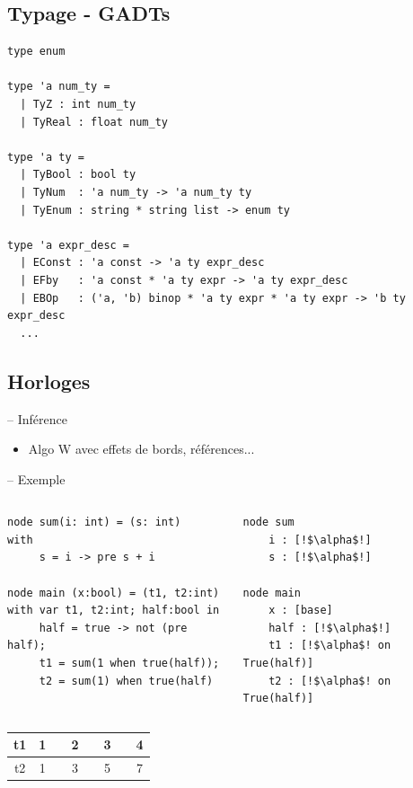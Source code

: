 \documentclass[11pt,usenames,dvipsnames]{beamer}
\begin{document}
\subsection{Typage - GADTs}
\begin{frame}[fragile]{\null}
  \begin{lstlisting}[language=caml]
type enum

type 'a num_ty =
  | TyZ : int num_ty
  | TyReal : float num_ty

type 'a ty =
  | TyBool : bool ty
  | TyNum  : 'a num_ty -> 'a num_ty ty
  | TyEnum : string * string list -> enum ty

type 'a expr_desc =
  | EConst : 'a const -> 'a ty expr_desc
  | EFby   : 'a const * 'a ty expr -> 'a ty expr_desc
  | EBOp   : ('a, 'b) binop * 'a ty expr * 'a ty expr -> 'b ty expr_desc
  ...
  \end{lstlisting}
\end{frame}

\subsection{Horloges}
\begin{frame}[fragile]{-- Inférence}
  \begin{itemize}
  \item Algo W avec effets de bords, références...
  \end{itemize}
\end{frame}

\begin{frame}[fragile]{-- Exemple}
  \begin{columns}
    \begin{column}{0.5\textwidth}
      \begin{lstlisting}[language=minils]
node sum(i: int) = (s: int)
with
     s = i -> pre s + i

node main (x:bool) = (t1, t2:int)
with var t1, t2:int; half:bool in
     half = true -> not (pre half);
     t1 = sum(1 when true(half));
     t2 = sum(1) when true(half)
   \end{lstlisting}
 \end{column}
 \begin{column}{0.5\textwidth}
   \pause
   \begin{lstlisting}[escapechar=!]
node sum
    i : [!$\alpha$!]
    s : [!$\alpha$!]

node main
    x : [base]
    half : [!$\alpha$!]
    t1 : [!$\alpha$! on True(half)]
    t2 : [!$\alpha$! on True(half)]
  \end{lstlisting}
 \end{column}
\end{columns}
\pause
\begin{center}
  \begin{tabular}{|c|ccccccc|}
    \hline
    t1    & 1 &  & 2 & & 3 & & 4\\
    \hline
    t2    & 1 &  & 3 & & 5 & & 7\\
    \hline
  \end{tabular}
\end{center}
\end{frame}
\end{document}
